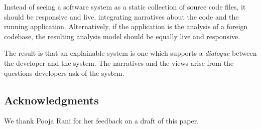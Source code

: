\documentclass[conference]{IEEEtran}
\begin{document}
Instead of seeing a software system as a static collection of source code files, it should be responsive and live, integrating narratives about the code and the running application.
Alternatively, if the application is the analysis of a foreign codebase, the resulting analysis model should be equally live and responsive.

The result is that an explainable system is one which supports a \emph{dialogue} between the developer and the system.
The narratives and the views arise from the questions developers ask of the system.


\subsection*{Acknowledgments}
We thank Pooja Rani for her feedback on a draft of this paper.





\end{document}
